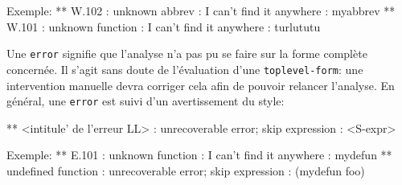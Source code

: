 \begin{Code*}
Exemple:
** W.102 : unknown abbrev : I can't find it anywhere : myabbrev
** W.101 : unknown function : I can't find it anywhere : turlututu
\end{Code*}
Une {\tt error} signifie que l'analyse n'a pas pu se faire sur la
forme compl\`{e}te concern\'{e}e. Il s'agit sans doute de l'\'{e}valuation
d'une {\tt toplevel-form}: une intervention manuelle devra corriger
cela afin de pouvoir relancer l'analyse. En g\'{e}n\'{e}ral, une {\tt error}
est suivi d'un avertissement du style:
\begin{Longcode*}
** <intitule' de l'erreur LL> : unrecoverable error; skip expression : <S-expr>

Exemple:
** E.101 : unknown function : I can't find it anywhere : mydefun
** undefined function : unrecoverable error; skip expression : (mydefun foo)
\end{Longcode*}

